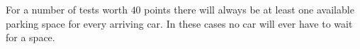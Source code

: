 For a number of tests worth $40$ points there will always be at least one available parking space for every arriving car. In these cases no car will ever have to wait for a space. 